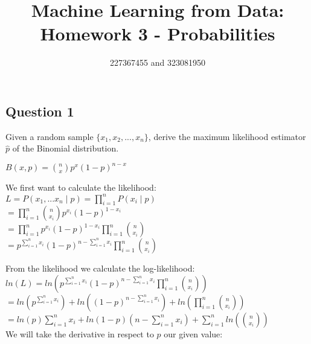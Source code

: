 \documentclass[12pt]{article}
\title{Machine Learning from Data: Homework 3 - Probabilities}
\author{227367455 and 323081950}
\begin{document}
\maketitle

\begin{center}
\section*{Question 1}

\end{center}
Given a random sample $\lbrace x_1 , x_2 , ... , x_n \rbrace$, derive the
 maximum likelihood estimator $\hat{p}$ of the Binomial distribution. \\

\begin{center}
$ B(x,p) = \binom{n}{x} p^x (1-p)^{n-x}$ 
\end{center} 

We first want to calculate the likelihood: \\

$ L = P(x_1,...x_n \mid p) =  \prod^{n}_{i = 1} P(x_i \mid p) $ \\

$ =  \prod^{n}_{i = 1} \binom{n}{x_i} p^{x_i} (1-p)^{1-x_i} $ \\

$ = \prod^{n}_{i = 1} p^{x_i} (1-p)^{1-x_i}  \prod^{n}_{i = 1} \binom{n}{x_i}  $ \\

$ = p^{\sum^{n}_{i = 1} x_i} (1-p)^{n - \sum^{n}_{i = 1} x_i}  \prod^{n}_{i = 1} \binom{n}{x_i} $ \\

\newpage

From the likelihood we calculate the log-likelihood: \\

$ ln(L) = ln(p^{\sum^{n}_{i = 1} x_i} (1-p)^{n - \sum^{n}_{i = 1} x_i}  \prod^{n}_{i = 1} \binom{n}{x_i}) $ \\

$ =  ln(p^{\sum^{n}_{i = 1} x_i}) + ln( (1-p)^{n - \sum^{n}_{i = 1} x_i}) + ln(\prod^{n}_{i = 1} \binom{n}{x_i})  $ \\

$ = ln(p) \sum^{n}_{i = 1} x_i + ln( 1-p) (n - \sum^{n}_{i = 1} x_i) +  \sum^{n}_{i = 1} ln(\binom{n}{x_i})$ \\

We will take the derivative in respect to $p$ our given value: \\
\end{document}

